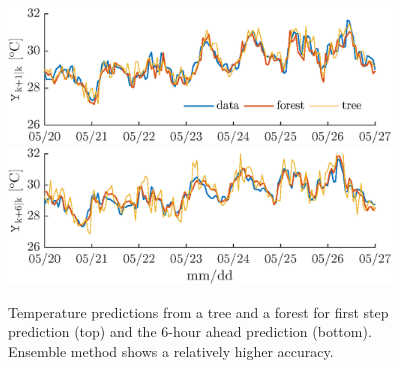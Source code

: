 \begin{figure}[h!]
	\centering
	\includegraphics[width=24pc]{figures/validation-s1.eps}
	\includegraphics[width=24pc]{figures/validation-s6.eps}
	\caption{Temperature predictions from a tree and a forest for first step prediction (top) and the 6-hour ahead prediction (bottom). Ensemble method shows a relatively higher accuracy.}
	\captionsetup{justification=centering}
	\label{F:validation}
\end{figure}


